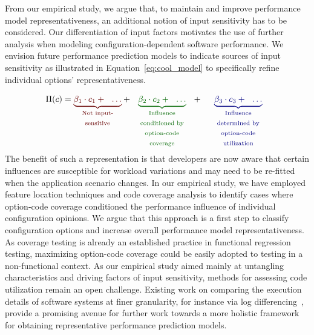 From our empirical study, we argue that, to maintain and improve performance model representativeness, an additional notion of input sensitivity has to be considered. Our differentiation of input factors motivates the use of further analysis when modeling configuration-dependent software performance. We envision future performance prediction models to indicate sources of input sensitivity as illustrated in Equation~\ref{eq:cool_model} to specifically refine individual options’ representativeness.

\begin{equation}
	\Pi(c) = {\color{red!40!black}
		\underbrace{\beta_1 \cdot c_1 + ~~\ldots}_{\text{\parbox{1.4cm}{\centering Not input-sensitive}}}
	} + {\color{green!40!black}
			 \underbrace{\beta_2 \cdot c_2 +  ~~\ldots}_{\text{\parbox{2.5cm}{\centering Influence conditioned by option-code coverage}}}
		} + ~~
			 {\color{blue!50!black}
			 	\underbrace{\beta_3 \cdot c_3 + ~~\ldots}_{\text{\parbox{2.5cm}{\centering Influence determined by option-code utilization}}}
			 }
\label{eq:cool_model}
\end{equation}
The benefit of such a representation is that developers are now aware that certain influences are susceptible for workload variations and may need to be re-fitted when the application scenario changes.
In our empirical study, we have employed feature location techniques and code coverage analysis to identify cases where option-code coverage conditioned the performance influence of individual configuration opinions. We argue that this approach is a first step to classify configuration options and increase overall performance model representativeness. As coverage testing is already an established practice in functional regression testing, maximizing option-code coverage could be easily adopted to testing in a non-functional context. 
As our empirical study aimed mainly at untangling characteristics and driving factors of input sensitivity, methods for assessing code utilization remain an open challenge. Existing work on comparing the execution details of software systems at finer granularity, for instance via log differencing~\cite{bao_logdiff_ase_2019}, provide a promising avenue for further work towards a more holistic framework for obtaining representative performance prediction models.


